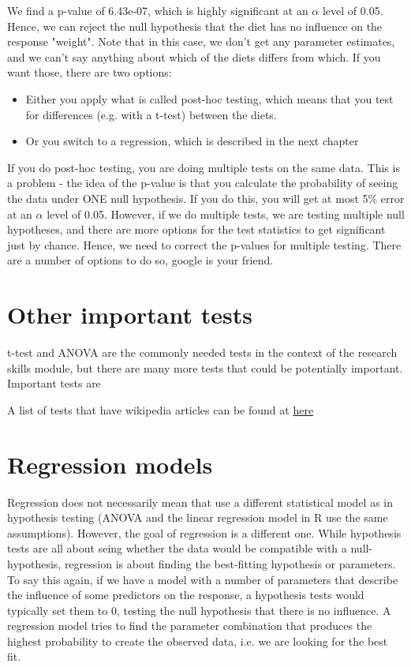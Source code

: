 \documentclass[a4paper,twoside]{tufte-book} %
\begin{document}
We find a p-value of  6.43e-07, which is highly significant at an $\alpha$ level of 0.05. Hence, we can reject the null hypothesis that the diet has no influence on the response "weight". Note that in this case, we don't get any parameter estimates, and we can't say anything about which of the diets differs from which. If you want those, there are two options:
\begin{itemize}
\item Either you apply what is called post-hoc testing, which means that you test for differences (e.g. with a t-test) between the diets.
\item Or you switch to a regression, which is described in the next chapter
\end{itemize}
If you do post-hoc testing, you are doing multiple tests on the same data. This is a problem - the idea of the p-value is that you calculate the probability of seeing the data under ONE null hypothesis. If you do this, you will get at most 5\% error at an $\alpha$ level of 0.05.  However, if we do multiple tests, we are testing multiple null hypotheses, and there are more options for the test statistics to get significant just by chance. Hence, we need to correct the p-values for multiple testing. There are a number of options to do so, google is your friend. 

\section{Other important tests}

t-test and ANOVA are the commonly needed tests in the context of the research skills module, but there are many more tests that could be potentially important. Important tests are 


A list of tests that have wikipedia articles can be found at \href{http://en.wikipedia.org/wiki/Category:Statistical_tests}{here} 


\section{Regression models}

Regression does not necessarily mean that use a different statistical model as in hypothesis testing (ANOVA and the linear regression model in R use the same assumptions). However, the goal of regression is a different one. While hypothesis tests are all about seing whether the data would be compatible with a null-hypothesis, regression is about finding the best-fitting hypothesis or parameters. To say this again, if we have a model with a number of parameters that describe the influence of some predictors on the response, a hypothesis tests would typically set them to 0, testing the null hypothesis that there is no influence. A regression model tries to find the parameter combination that produces the highest probability to create the observed data, i.e. we are looking for the best fit.
\end{document}
